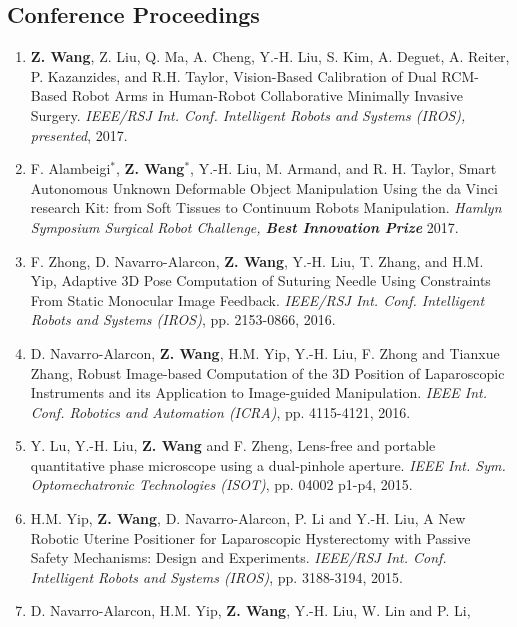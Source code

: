 \documentclass[10pt,letterpaper]{article}
\begin{document}
\subsection*{Conference Proceedings}
\begin{enumerate}
    \item \textbf{Z. Wang}, Z. Liu, Q. Ma, A. Cheng, Y.-H. Liu, S. Kim, A. Deguet, A. Reiter, P. Kazanzides, and R.H. Taylor,
    Vision-Based Calibration of Dual RCM-Based Robot Arms in Human-Robot Collaborative Minimally Invasive Surgery.
    \textit{{IEEE/RSJ} Int. Conf. Intelligent Robots and Systems (IROS), presented}, 2017.
    \item F. Alambeigi$^*$, \textbf{Z. Wang}$^*$, Y.-H. Liu, M. Armand, and R. H. Taylor,
    Smart Autonomous Unknown Deformable Object Manipulation Using the da Vinci research Kit: from Soft Tissues to Continuum Robots Manipulation.
    \textit{Hamlyn Symposium Surgical Robot Challenge, \textbf{Best Innovation Prize}} 2017.
    \item F. Zhong, D. Navarro-Alarcon, \textbf{Z. Wang}, Y.-H. Liu, T. Zhang, and H.M. Yip,
    Adaptive 3D Pose Computation of Suturing Needle Using Constraints From Static Monocular Image Feedback.
    \textit{{IEEE/RSJ} Int. Conf. Intelligent Robots and Systems (IROS)}, pp. 2153-0866, 2016.
    \item D. Navarro-Alarcon, \textbf{Z. Wang}, H.M. Yip, Y.-H. Liu, F. Zhong and Tianxue Zhang,
    Robust Image-based Computation of the 3D Position of Laparoscopic Instruments and its Application to Image-guided Manipulation.
    \textit{{IEEE} Int. Conf. Robotics and Automation (ICRA)}, pp. 4115-4121, 2016.
    \item Y. Lu, Y.-H. Liu, \textbf{Z. Wang} and F. Zheng,
    Lens-free and portable quantitative phase microscope using a dual-pinhole aperture.
    \textit{{IEEE} Int. Sym. Optomechatronic Technologies (ISOT)}, pp. 04002 p1-p4, 2015.
    \item H.M. Yip, \textbf{Z. Wang}, D. Navarro-Alarcon, P. Li and Y.-H. Liu,
    A New Robotic Uterine Positioner for Laparoscopic Hysterectomy with Passive Safety Mechanisms: Design and Experiments.
    \textit{{IEEE/RSJ} Int. Conf. Intelligent Robots and Systems (IROS)}, pp. 3188-3194, 2015.
    \item D. Navarro-Alarcon, H.M. Yip, \textbf{Z. Wang}, Y.-H. Liu, W. Lin and P. Li,

\end{enumerate}
\end{document}
